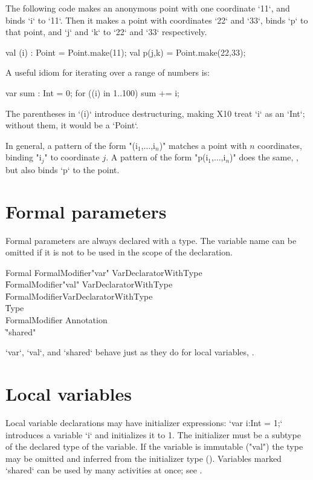 The following code makes an anonymous point with one coordinate \xcd`11`, and
binds \xcd`i` to \xcd`11`.  Then it makes a point with coordinates \xcd`22`
and \xcd`33`, binds \xcd`p` to that point, and \xcd`j` and \xcd`k` to \xcd`22`
and \xcd`33` respectively.
\begin{xten}
val (i) : Point = Point.make(11);
val p(j,k) = Point.make(22,33);
\end{xten}

A useful idiom for iterating over a range of numbers is: 
\begin{xten}
var sum : Int = 0;
for ((i) in 1..100) sum += i;
\end{xten}
\noindent
The parentheses in \xcd`(i)` introduce destructuring, making X10 treat \xcd`i`
as an \xcd`Int`; without them, it would be a \xcd`Point`.  

In general, a pattern of the form \xcdmath"(i$_1$,$\ldots$,i$_n$)" matches a
point with {$n$} coordinates, binding \xcdmath"i$_j$" to coordinate {$j$}.  
A pattern of the form \xcdmath"p(i$_1$,$\ldots$,i$_n$)" does the same, , but
also binds \xcd`p` to the point.

\section{Formal parameters}
Formal parameters are always declared with a type.
The variable name can be omitted if it is not to be used in the
scope of the declaration.

\begin{grammar}
Formal
        \: FormalModifier\star \xcd"var" VarDeclaratorWithType \\
        \| FormalModifier\star \xcd"val" VarDeclaratorWithType \\
        \| FormalModifier\star VarDeclaratorWithType \\
        \| Type \\
FormalModifier \: Annotation \\
              \| \xcd"shared" \\
\end{grammar}

\xcd`var`, \xcd`val`, and \xcd`shared` behave just as they do for local
variables, .

\section{Local variables}\label{local-variables}
Local variable declarations may have
initializer expressions: \xcd`var i:Int = 1;` introduces 
a variable \xcd`i` and initializes it to 1.
The initializer must be a subtype of
the declared type of the variable.  If the variable is immutable
(\xcd"val")
the type may be omitted and
inferred from the initializer type ().
Variables marked \xcd`shared` can be used by many activities at once; see
.


